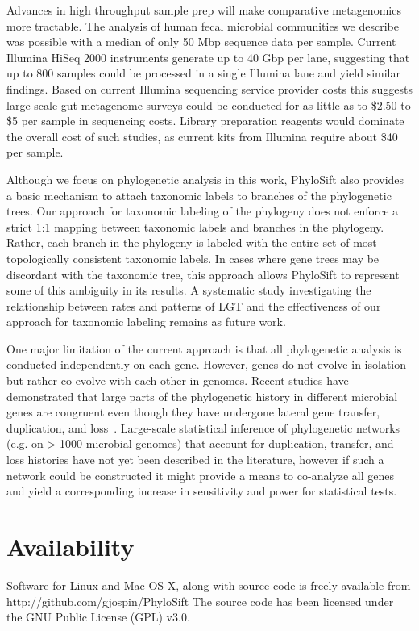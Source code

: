 \documentclass[10pt]{article}
\begin{document}
Advances in high throughput sample prep will make comparative metagenomics more tractable.
The analysis of human fecal microbial communities we describe was possible with a median of only 50 Mbp sequence data per sample.
Current Illumina HiSeq 2000 instruments generate up to 40 Gbp per lane, suggesting that up to 800 samples could be processed in a single Illumina lane and yield similar findings.
Based on current Illumina sequencing service provider costs this suggests large-scale gut metagenome surveys could be conducted for as little as to \$2.50 to \$5 per sample in sequencing costs.
Library preparation reagents would dominate the overall cost of such studies, as current kits from Illumina require about \$40 per sample.

Although we focus on phylogenetic analysis in this work, PhyloSift also provides a basic mechanism to attach taxonomic labels to branches of the phylogenetic trees. 
Our approach for taxonomic labeling of the phylogeny does not enforce a strict 1:1 mapping between taxonomic labels and  branches in the phylogeny. 
Rather, each branch in the phylogeny is labeled with the entire set of most topologically consistent taxonomic labels. 
In cases where gene trees may be discordant with the taxonomic tree, this approach allows PhyloSift to represent some of this ambiguity in its results.
A systematic study investigating the relationship between rates and patterns of LGT and the effectiveness of our approach for taxonomic labeling remains as future work.

One major limitation of the current approach is that all phylogenetic analysis is conducted independently on each gene.
However, genes do not evolve in isolation but rather co-evolve with each other in genomes.
Recent studies have demonstrated that large parts of the phylogenetic history in different microbial genes are congruent even though they have undergone lateral gene transfer, duplication, and loss~\cite{Szollosi2012,Boussau2012}.
Large-scale statistical inference of phylogenetic networks (e.g. on > 1000 microbial genomes) that account for duplication, transfer, and loss histories have not yet been described in the literature, however if such a network could be constructed it might provide a means to co-analyze all genes and yield a corresponding increase in sensitivity and power for statistical tests.

\section*{Availability}
Software for Linux and Mac OS X, along with source code is freely available from http://github.com/gjospin/PhyloSift
The source code has been licensed under the GNU Public License (GPL) v3.0.
\end{document}
